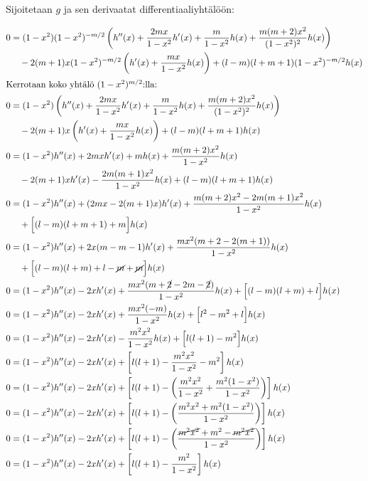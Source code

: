 \documentclass[../johdoksia.tex]{subfiles}
\begin{document}
	Sijoitetaan $g$ ja sen derivaatat differentiaaliyhtälöön:
	
	\begin{align*}
		0 &= (1 - x^2)(1 - x^2)^{-m/2}\left(h''(x) + \frac{2mx}{1 - x^2}h'(x) + \frac{m}{1 - x^2}h(x) + \frac{m(m + 2)x^2}{(1 - x^2)^2}h(x)\right) \\
		&\quad - 2(m + 1)x(1 - x^2)^{-m/2}\left(h'(x) + \frac{mx}{1 - x^2}h(x)\right) + (l - m)(l + m + 1)(1 - x^2)^{-m/2}h(x) \\
		\intertext{Kerrotaan koko yhtälö $(1 - x^2)^{m/2}$:lla:}
		0 &= (1 - x^2)\left(h''(x) + \frac{2mx}{1 - x^2}h'(x) + \frac{m}{1 - x^2}h(x) + \frac{m(m + 2)x^2}{(1 - x^2)^2}h(x)\right) \\
		&\quad - 2(m + 1)x\left(h'(x) + \frac{mx}{1 - x^2}h(x)\right) + (l - m)(l + m + 1)h(x) \\
		0 &= (1 - x^2)h''(x) + 2mxh'(x) + mh(x) + \frac{m(m + 2)x^2}{1 - x^2}h(x) \\
		&\quad - 2(m + 1)xh'(x) - \frac{2m(m + 1)x^2}{1 - x^2}h(x) + (l - m)(l + m + 1)h(x) \\
		0 &= (1 - x^2)h''(x) + (2mx - 2(m + 1)x)h'(x) + \frac{m(m + 2)x^2 - 2m(m + 1)x^2}{1 - x^2}h(x) \\
		&\quad  + \Big[(l - m)(l + m + 1) + m\Big]h(x) \\
		0 &= (1 - x^2)h''(x) + 2x(m - m - 1)h'(x) + \frac{mx^2(m + 2 - 2(m + 1))}{1 - x^2}h(x) \\
		&\quad  + \Big[(l - m)(l + m) + l - \cancel{m} + \cancel{m}\Big]h(x) \\
		0 &= (1 - x^2)h''(x) - 2xh'(x) + \frac{mx^2(m + \cancel{2} - 2m - \cancel{2})}{1 - x^2}h(x) + \Big[(l - m)(l + m) + l\Big]h(x) \\
		0 &= (1 - x^2)h''(x) - 2xh'(x) + \frac{mx^2(-m)}{1 - x^2}h(x) + \Big[l^2 - m^2 + l\Big]h(x) \\
		0 &= (1 - x^2)h''(x) - 2xh'(x) - \frac{m^2x^2}{1 - x^2}h(x) + \Big[l(l + 1) - m^2\Big]h(x) \\
		0 &= (1 - x^2)h''(x) - 2xh'(x) + \left[l(l + 1) - \frac{m^2x^2}{1 - x^2} - m^2\right]h(x) \\
		0 &= (1 - x^2)h''(x) - 2xh'(x) + \left[l(l + 1) - \left(\frac{m^2x^2}{1 - x^2} + \frac{m^2(1 - x^2)}{1 - x^2}\right)\right]h(x) \\
		0 &= (1 - x^2)h''(x) - 2xh'(x) + \left[l(l + 1) - \left(\frac{m^2x^2 + m^2(1 - x^2)}{1 - x^2}\right)\right]h(x) \\
		0 &= (1 - x^2)h''(x) - 2xh'(x) + \left[l(l + 1) - \left(\frac{\cancel{m^2x^2} + m^2 - \cancel{m^2x^2}}{1 - x^2}\right)\right]h(x) \\
		0 &= (1 - x^2)h''(x) - 2xh'(x) + \left[l(l + 1) - \frac{m^2}{1 - x^2}\right]h(x)
	\end{align*}
\end{document}
